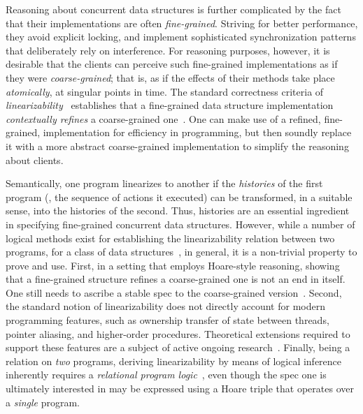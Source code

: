 Reasoning about concurrent data structures is further complicated by
the fact that their implementations are often \emph{fine-grained}.
Striving for better performance, they avoid explicit locking, and
implement sophisticated synchronization patterns that deliberately
rely on interference.
% 
For reasoning purposes, however, it is desirable that the clients can
perceive such fine-grained implementations as if they were
\emph{coarse-grained}; that is, as if the effects of their methods
take place \emph{atomically}, at singular points in time.  The
standard correctness criteria of
\emph{linearizability}~\cite{Herlihy-WingTOPLAS90} establishes that a
fine-grained data structure implementation \emph{contextually refines}
a coarse-grained one~\cite{Filipovic-al:TCS10}. One can make use of a
refined, fine-grained, implementation for efficiency in programming,
but then soundly replace it with a more abstract coarse-grained
implementation to simplify the reasoning about clients.


Semantically, one program linearizes to another if the
\emph{histories} of the first program (\ie, the sequence of actions it
executed) can be transformed, in a suitable sense, into the histories
of the second. Thus, histories are an essential ingredient in
specifying fine-grained concurrent data structures. However, while a
number of logical methods exist for establishing the linearizability
relation between two programs, for a class of data
structures~\cite{OHearn-al:PODC10,Elmas-al:TACAS10,Vafeiadis:PhD,Liang-Feng:PLDI13},
in general, it is a non-trivial property to prove and use. First, in a
setting that employs Hoare-style reasoning, showing that a
fine-grained structure refines a coarse-grained one is not an end in
itself. One still needs to ascribe a stable spec to the coarse-grained
version~\cite{Turon-al:ICFP13,Liang-Feng:PLDI13}.
%
Second, the standard notion of linearizability does not directly
account for modern programming features, such as ownership transfer of
state between threads, pointer aliasing, and higher-order
procedures. Theoretical extensions required to support these features
are a subject of active ongoing
research~\cite{Cerone-al:ICALP14,Gotsman-Yang:CONCUR12}.
%
Finally, being a relation on \emph{two} programs, deriving
linearizability by means of logical inference inherently requires a
\emph{relational program
  logic}~\cite{Turon-al:ICFP13,Liang-Feng:PLDI13}, even though the
spec one is ultimately interested in 
may be expressed using a Hoare triple that operates over a
\emph{single} program.


